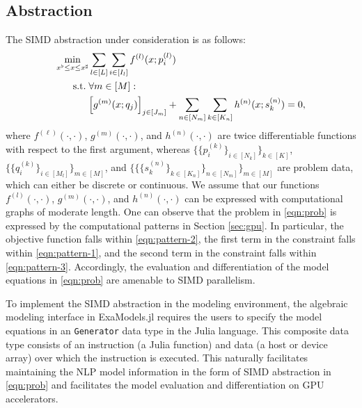 \documentclass{IEEEtran4PSCC} %
\newcommand{\st}{\mathop{\text{\normalfont s.t.}}}
\begin{document}
\subsection{Abstraction}
The SIMD abstraction under consideration is as follows:
\begin{align}\label{eqn:prob}
  \min_{x^\flat\leq x \leq x^\sharp}
  & \sum_{l\in[L]}\sum_{i\in [I_l]} f^{(l)}(x; p^{(l)}_i)\\\nonumber
  \st\; &\forall m\in[M]:\\\nonumber
  &\begin{aligned}[t]
    \left[g^{(m)}(x; q_j)\right]_{j\in [J_m]} +\sum_{n\in [N_m]}\sum_{k\in [K_n]}h^{(n)}(x; s^{(n)}_{k}) =0,
  \end{aligned}
  \end{align}
where $f^{(\ell)}(\cdot,\cdot)$, $g^{(m)}(\cdot,\cdot)$, and
$h^{(n)}(\cdot,\cdot)$ are twice differentiable functions with respect
to the first argument, whereas $\{\{p^{(k)}_i\}_{i\in [N_k]}\}_{k\in[K]}$,
$\{\{q^{(k)}_{i}\}_{i\in [M_l]}\}_{m\in[M]}$, and
$\{\{\{s^{(n)}_{k}\}_{k\in[K_n]}\}_{n\in[N_m]}\}_{m\in[M]}$ are
problem data, which can either be discrete or continuous.  We assume
that our functions $f^{(l)}(\cdot,\cdot)$, $g^{(m)}(\cdot,\cdot)$, and
$h^{(n)}(\cdot,\cdot)$ can be expressed with computational
graphs of moderate length. One can observe that the problem in
\eqref{eqn:prob} is expressed by the computational patterns in Section
\ref{sec:gpu}. In particular, the objective function falls within \ref{eqn:pattern-2},
the first term in the constraint falls within \ref{eqn:pattern-1}, and the second term in the constraint falls within \ref{eqn:pattern-3}.
Accordingly, the evaluation and differentiation of the
model equations in \eqref{eqn:prob} are amenable to SIMD parallelism.

To implement the SIMD abstraction in the modeling environment, the
algebraic modeling interface in ExaModels.jl requires the users to
specify the model equations in an {\tt Generator} data type in the
Julia language. This composite data type consists of an instruction (a Julia
function) and data (a host or device array) over which the instruction
is executed. This naturally facilitates maintaining the NLP model
information in the form of SIMD abstraction in \eqref{eqn:prob} and
facilitates the model evaluation and differentiation on GPU
accelerators.
\end{document}
